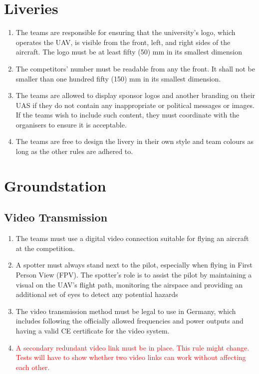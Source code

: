 \documentclass{article}
\begin{document}
\section{Liveries}
\begin{enumerate}
  \item The teams are responsible for ensuring that the university's logo, which operates the UAV, is visible from the front, left, and right sides of the aircraft. The logo must be at least fifty (50) mm in its smallest dimension  \item The competitors' number must be readable from any the front. It shall not be smaller than one hundred fifty (150) mm in its smallest dimension.
  \item The teams are allowed to display sponsor logos and another branding on their UAS if they do not contain any inappropriate or political messages or images. If the teams wish to include such content, they must coordinate with the organisers to ensure it is acceptable. 
  \item The teams are free to design the livery in their own style and team colours as long as the other rules are adhered to. 
\end{enumerate}


\section{Groundstation}
\subsection{Video Transmission}
\begin{enumerate}
  \item The teams must use a digital video connection suitable for flying an aircraft at the competition. 
  \item A spotter must always stand next to the pilot, especially when flying in First Person View (FPV). The spotter's role is to assist the pilot by maintaining a visual on the UAV's flight path, monitoring the airspace and providing an additional set of eyes to detect any potential hazards
  \item The video transmission method must be legal to use in Germany, which includes following the officially allowed frequencies and power outputs and having a valid CE certificate for the video system.
  \item \textcolor{red}{A secondary redundant video link must be in place. This rule might change. Tests will have to show whether two video links can work without affecting each other.}
\end{enumerate}
\end{document}

